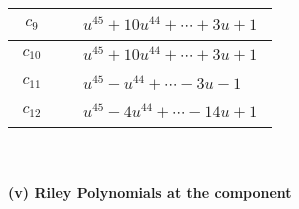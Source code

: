 \documentclass[1p]{elsarticle_modified}
\theoremstyle{definition}
\begin{document}
\begin{tabular}{m{50pt}|m{274pt}}
\hline $$\begin{aligned}c_{9}\end{aligned}$$&$\begin{aligned}
&u^{45}+10 u^{44}+\cdots+3 u+1
\end{aligned}$\\
\hline $$\begin{aligned}c_{10}\end{aligned}$$&$\begin{aligned}
&u^{45}+10 u^{44}+\cdots+3 u+1
\end{aligned}$\\
\hline $$\begin{aligned}c_{11}\end{aligned}$$&$\begin{aligned}
&u^{45}- u^{44}+\cdots-3 u-1
\end{aligned}$\\
\hline $$\begin{aligned}c_{12}\end{aligned}$$&$\begin{aligned}
&u^{45}-4 u^{44}+\cdots-14 u+1
\end{aligned}$\\
\hline
\end{tabular}\\~\\
\newpage\renewcommand{\arraystretch}{1}
\flushleft \textbf{(v) Riley Polynomials at the component}\newline \\
\end{document}
